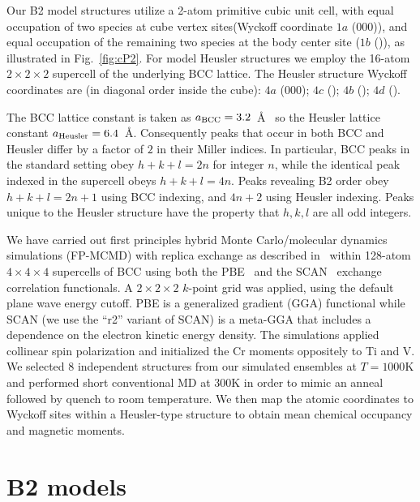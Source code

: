 \documentclass[twoside,12pt]{article}
\begin{document}
Our B2 model structures utilize a 2-atom primitive cubic unit cell, with equal occupation of two species at cube vertex sites(Wyckoff coordinate $1a$ (000)), and equal occupation of the remaining two species at the body center site ($1b$ (\textonehalf \textonehalf \textonehalf)), as illustrated in Fig.~\ref{fig:cP2}. For model Heusler structures we employ the 16-atom $2\times 2\times 2$ supercell of the underlying BCC lattice. The Heusler structure Wyckoff coordinates are (in diagonal order inside the cube): $4a$ (000); $4c$ (\textonequarter \textonequarter \textonequarter); $4b$ (\textonehalf \textonehalf \textonehalf); $4d$ (\textthreequarters\textthreequarters\textthreequarters).

The BCC lattice constant is taken as $a_{\rm BCC}=3.2$~\AA~ so the Heusler lattice constant $a_{\rm Heusler}=6.4$~\AA. Consequently peaks that occur in both BCC and Heusler differ by a factor of $2$ in their Miller indices. In particular, BCC peaks in the standard setting obey $h+k+l=2n$ for integer $n$, while the identical peak indexed in the supercell obeys $h+k+l=4n$. Peaks revealing B2 order obey $h+k+l=2n+1$ using BCC indexing, and $4n+2$ using Heusler indexing. Peaks unique to the Heusler structure have the property that $h, k, l$ are all odd integers.

We have carried out first principles hybrid Monte Carlo/molecular dynamics simulations (FP-MCMD) with replica exchange as described in~\cite{Widom_2024} within 128-atom $4\times 4\times 4$ supercells of BCC using both the PBE~\cite{Perdew96} and the SCAN~\cite{r2SCAN} exchange correlation functionals. A $2\times 2\times 2$ $k$-point grid was applied, using the default plane wave energy cutoff. PBE is a generalized gradient (GGA) functional while SCAN (we use the ``r2'' variant of SCAN) is a meta-GGA that includes a dependence on the electron kinetic energy density. The simulations applied collinear spin polarization and initialized the Cr moments oppositely to Ti and V. We selected 8 independent structures from our simulated ensembles at $T=1000$K and performed short conventional MD at 300K in order to mimic an anneal followed by quench to room temperature. We then map the atomic coordinates to Wyckoff sites within a Heusler-type structure to obtain mean chemical occupancy and magnetic moments.

\section{B2 models}
\label{sec:X-ray}
\end{document}
